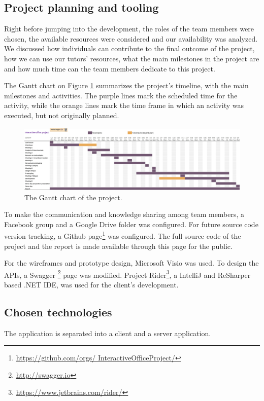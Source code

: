 \subsection{Project planning and tooling}
Right before jumping into the development, the roles of the team members were chosen, the available resources were 
considered and our availability was analyzed. We discussed how individuals can contribute to the final outcome of the 
project, how we can use our tutors' resources, what the main milestones in the project are and how much time can the 
team members dedicate to this project. 

The Gantt chart on Figure \ref{gantt-chart} summarizes the project's timeline, with the main milestones and 
activities. The purple lines mark the scheduled time for the activity, while the orange lines mark the time frame in 
which an activity was executed, but not originally planned.
 
\begin{figure}[h] 
		\begin{center}
			\includegraphics[width=1\textwidth]{images/gantt-chart.png}
			\caption{The Gantt chart of the project.}
			\label{gantt-chart}
		\end{center}
	\end{figure} 
 
To make the communication and knowledge sharing among team members, a Facebook group and a Google Drive folder was 
configured. For future source code version tracking, a Github page\footnote{\url{https://github.com/orgs/
InteractiveOfficeProject/}} was configured. The full source code of the project and the report is made available 
through this page for the public. 

For the wireframes and prototype design, Microsoft Visio was used. To design the APIs, a Swagger \footnote{\url{http://swagger.io}} 
page was modified. Project Rider\footnote{\url{https://www.jetbrains.com/rider/}}, a IntelliJ and ReSharper based .NET 
IDE, was used for the client's development.

\subsection{Chosen technologies}
The application is separated into a client and a server application.

